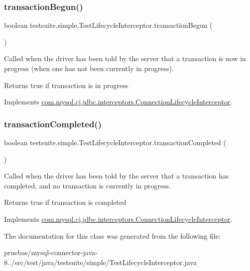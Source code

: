 \subsubsection{\texorpdfstring{transaction\+Begun()}{transactionBegun()}}
{\footnotesize\ttfamily boolean testsuite.\+simple.\+Test\+Lifecycle\+Interceptor.\+transaction\+Begun (\begin{DoxyParamCaption}{ }\end{DoxyParamCaption})}

Called when the driver has been told by the server that a transaction is now in progress (when one has not been currently in progress).

\begin{DoxyReturn}{Returns}
true if transaction is in progress 
\end{DoxyReturn}


Implements \mbox{\hyperlink{interfacecom_1_1mysql_1_1cj_1_1jdbc_1_1interceptors_1_1_connection_lifecycle_interceptor_a8786e9ce2e821f0f59bffc9343ffbb7c}{com.\+mysql.\+cj.\+jdbc.\+interceptors.\+Connection\+Lifecycle\+Interceptor}}.

\mbox{\label{classtestsuite_1_1simple_1_1_test_lifecycle_interceptor_a00973c1a52ebc81176be2b9a46f5aa66}} 
\subsubsection{\texorpdfstring{transaction\+Completed()}{transactionCompleted()}}
{\footnotesize\ttfamily boolean testsuite.\+simple.\+Test\+Lifecycle\+Interceptor.\+transaction\+Completed (\begin{DoxyParamCaption}{ }\end{DoxyParamCaption})}

Called when the driver has been told by the server that a transaction has completed, and no transaction is currently in progress.

\begin{DoxyReturn}{Returns}
true if transaction is completed 
\end{DoxyReturn}


Implements \mbox{\hyperlink{interfacecom_1_1mysql_1_1cj_1_1jdbc_1_1interceptors_1_1_connection_lifecycle_interceptor_a53811dd190160d999a9e217cf9208a84}{com.\+mysql.\+cj.\+jdbc.\+interceptors.\+Connection\+Lifecycle\+Interceptor}}.



The documentation for this class was generated from the following file\+:\begin{DoxyCompactItemize}
\item 
pruebas/mysql-\/connector-\/java-\/8../src/test/java/testsuite/simple/Test\+Lifecycle\+Interceptor.\+java\end{DoxyCompactItemize}
